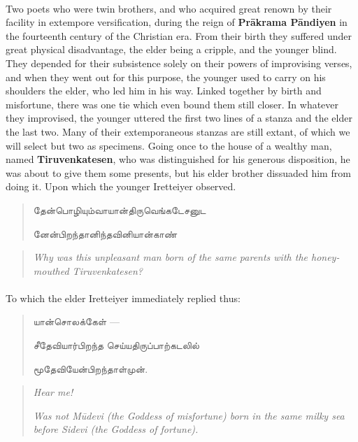 \documentclass{article}
\newcommand{\TamilText}[1]{\texttamil{#1}}
\newcommand{\tam}[1]{\TamilText{#1}}
\begin{document}
\paragraph{}
Two poets who were twin brothers, and who acquired great renown by their facility in extempore versification, during the reign of \textbf{Pr\={a}krama P\={a}ndiyen} in the fourteenth century of the Christian era. From their birth they suffered under great physical disadvantage, the elder being a cripple, and the younger blind. They depended for their subsistence solely on their powers of improvising verses, and when they went out for this purpose, the younger used to carry on his shoulders the elder, who led him in his way. Linked together by birth and misfortune, there was one tie which even bound them still closer. In whatever they improvised, the younger uttered the first two lines of a stanza and the elder the last two. Many of their extemporaneous stanzas are still extant, of which we will select but two as specimens. Going once to the house of a wealthy man, named \textbf{Tiruvenkatesen}, who was distinguished for his generous disposition, he was about to give them some presents, but his elder brother dissuaded him from doing it. Upon which the younger Iretteiyer observed.
\begin{quotation}\small
\tam{தேன்பொழியும்வாயான்திருவெங்கடேசனுட}

\tam{னேன்பிறந்தானிந்தவினியான்காண்‌}
\end{quotation}
\begin{quotation}\small
\emph{Why was this unpleasant man born of the same parents with the honey-mouthed Tiruvenkatesen?}
\end{quotation}
\paragraph{}
To which the elder Iretteiyer immediately replied thus:
\begin{quotation}\small
\hspace*{15mm}\tam{யான்சொலக்கேள்‌} ---

\tam{சீதேவியார்பிறந்த செய்யதிருப்பாற்கடலில்‌}

\tam{மூதேவியேன்‌பிறந்தாள்‌முன்‌}.
\end{quotation}
\begin{quotation}\small
\emph{Hear me!}

\emph{Was not M\={u}devi (the Goddess of misfortune) born in the same milky sea before Sidevi (the Goddess of fortune).}
\end{quotation}
\end{document}
